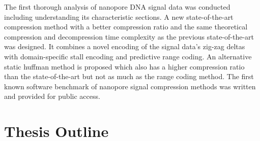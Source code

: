 The first thorough analysis of nanopore DNA signal data was conducted including
understanding its characteristic sections. A new state-of-the-art compression
method with a better compression ratio and the same theoretical compression and
decompression time complexity as the previous state-of-the-art was designed. It
combines a novel encoding of the signal data's zig-zag deltas with
domain-specific stall encoding and predictive range coding. An alternative
static huffman method is proposed which also has a higher compression ratio than
the state-of-the-art but not as much as the range coding method. The first known
software benchmark of nanopore signal compression methods was written and
provided for public access.

\section{Thesis Outline}
